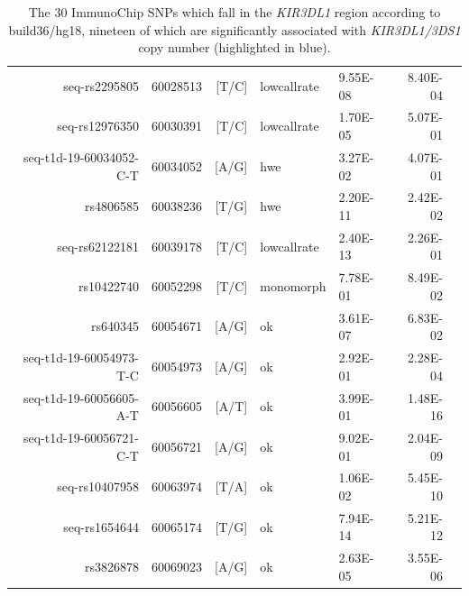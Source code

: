 \begin{table}[h]
\begin{center}
\begin{tabular}{rlrllrr}
\rowcolor{LightCyan}
seq-rs2295805           & 60028513 & [T/C] & lowcallrate & 9.55E-08 & 8.40E-04 \\
seq-rs12976350          & 60030391 & [T/C] & lowcallrate & 1.70E-05 & 5.07E-01 \\
seq-t1d-19-60034052-C-T & 60034052 & [A/G] & hwe         & 3.27E-02 & 4.07E-01 \\
\rowcolor{LightCyan}
rs4806585               & 60038236 & [T/G] & hwe         & 2.20E-11 & 2.42E-02 \\
\rowcolor{LightCyan}
seq-rs62122181          & 60039178 & [T/C] & lowcallrate & 2.40E-13 & 2.26E-01 \\
rs10422740              & 60052298 & [T/C] & monomorph   & 7.78E-01 & 8.49E-02 \\
\rowcolor{LightCyan}
rs640345                & 60054671 & [A/G] & ok          & 3.61E-07 & 6.83E-02 \\
seq-t1d-19-60054973-T-C & 60054973 & [A/G] & ok          & 2.92E-01 & 2.28E-04 \\
\rowcolor{LightCyan}
seq-t1d-19-60056605-A-T & 60056605 & [A/T] & ok          & 3.99E-01 & 1.48E-16 \\
\rowcolor{LightCyan}
seq-t1d-19-60056721-C-T & 60056721 & [A/G] & ok          & 9.02E-01 & 2.04E-09 \\
\rowcolor{LightCyan}
seq-rs10407958          & 60063974 & [T/A] & ok          & 1.06E-02 & 5.45E-10 \\
\rowcolor{LightCyan}
seq-rs1654644           & 60065174 & [T/G] & ok          & 7.94E-14 & 5.21E-12 \\
\rowcolor{LightCyan}
rs3826878               & 60069023 & [A/G] & ok          & 2.63E-05 & 3.55E-06 \\
   \hline
\end{tabular}
\end{center}
    \caption{
    \label{Table-S4}
        The 30 ImmunoChip SNPs which fall in the \emph{KIR3DL1} region according to build36/hg18, nineteen of which
        are significantly associated with \emph{KIR3DL1/3DS1} copy number (highlighted in blue).
    }
\end{table}


